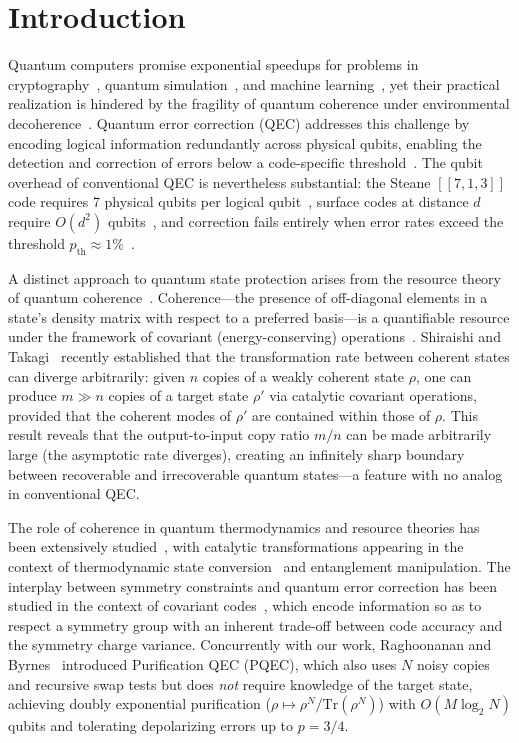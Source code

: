 \documentclass[a4paper,twocolumn]{quantumarticle}
\begin{document}
\section{Introduction}
\label{sec:introduction}

Quantum computers promise exponential speedups for problems in cryptography~\cite{Regev2024,Shor1997}, quantum simulation~\cite{Campbell2019,Feynman1982}, and machine learning~\cite{Ivashkov2024,Biamonte2017}, yet their practical realization is hindered by the fragility of quantum coherence under environmental decoherence~\cite{Zurek2003,NielsenChuang2010}.
Quantum error correction (QEC) addresses this challenge by encoding logical information redundantly across physical qubits, enabling the detection and correction of errors below a code-specific threshold~\cite{Shor1995,Gottesman1997}.
The qubit overhead of conventional QEC is nevertheless substantial: the Steane $[\![7,1,3]\!]$ code requires 7 physical qubits per logical qubit~\cite{Steane1996}, surface codes at distance $d$ require $O(d^2)$ qubits~\cite{Kitaev2003,Fowler2012}, and correction fails entirely when error rates exceed the threshold $p_\mathrm{th} \approx 1\%$~\cite{Knill2005}.

A distinct approach to quantum state protection arises from the resource theory of quantum coherence~\cite{Baumgratz2014,Streltsov2017}.
Coherence---the presence of off-diagonal elements in a state's density matrix with respect to a preferred basis---is a quantifiable resource under the framework of covariant (energy-conserving) operations~\cite{Marvian2014,Lostaglio2019}.
Shiraishi and Takagi~\cite{Shiraishi2024} recently established that the transformation rate between coherent states can diverge arbitrarily: given $n$ copies of a weakly coherent state $\rho$, one can produce $m \gg n$ copies of a target state $\rho'$ via catalytic covariant operations, provided that the coherent modes of $\rho'$ are contained within those of $\rho$.
This result reveals that the output-to-input copy ratio $m/n$ can be made arbitrarily large (the asymptotic rate diverges), creating an infinitely sharp boundary between recoverable and irrecoverable quantum states---a feature with no analog in conventional QEC.

The role of coherence in quantum thermodynamics and resource theories has been extensively studied~\cite{Lostaglio2019,Streltsov2017,Marvian2014}, with catalytic transformations appearing in the context of thermodynamic state conversion~\cite{Baumgratz2014} and entanglement manipulation.
The interplay between symmetry constraints and quantum error correction has been studied in the context of covariant codes~\cite{Faist2020,Hayden2008,Eastin2009}, which encode information so as to respect a symmetry group with an inherent trade-off between code accuracy and the symmetry charge variance.
Concurrently with our work, Raghoonanan and Byrnes~\cite{Raghoonanan2026} introduced Purification QEC (PQEC), which also uses $N$ noisy copies and recursive swap tests but does \emph{not} require knowledge of the target state, achieving doubly exponential purification ($\rho \mapsto \rho^N / \mathrm{Tr}(\rho^N)$) with $O(M \log_2 N)$ qubits and tolerating depolarizing errors up to $p = 3/4$.
\end{document}
